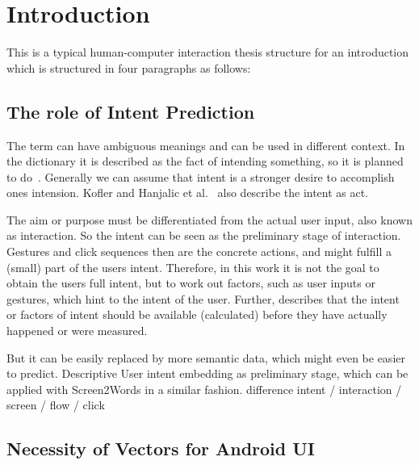 \chapter{Introduction}
\label{sec:introduction}

This is a typical human-computer interaction thesis structure for an introduction which is structured in four paragraphs as follows:

\section{The role of Intent Prediction}
\label{sec:role-intent-prediction}

The term  can have ambiguous meanings and can be used in different context.
In the dictionary it is described as the fact of intending something, so it is planned to do~\cite{dictionaryIntent}. %
Generally we can assume that intent is a stronger desire to accomplish ones intension.
Kofler and Hanjalic et al.~\cite{kofler2016user} also describe the intent as  act.

The aim or purpose must be differentiated from the actual user input, also known as interaction.
So the intent can be seen as the preliminary stage of interaction.
Gestures and click sequences then are the concrete actions, and might fulfill a (small) part of the users intent.
Therefore, in this work it is not the goal to obtain the users full intent, but to work out factors, such as user inputs or gestures, which hint to the intent of the user.
Further,  describes that the intent or factors of intent should be available (calculated) before they have actually happened or were measured.


But it can be easily replaced by more semantic data, which might even be easier to predict.
Descriptive User intent embedding as preliminary stage, which can be applied with Screen2Words\cite{screen2words} in a similar fashion.
difference intent / interaction / screen / flow / click


\section{Necessity of Vectors for Android UI}
\label{sec:necessity-of-vectors-for-android-ui}


